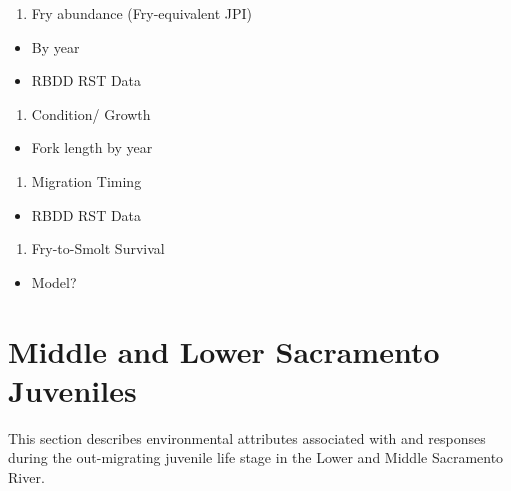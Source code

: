 \documentclass[
]{book}
\providecommand{\tightlist}{%
  \setlength{\itemsep}{0pt}\setlength{\parskip}{0pt}}
\theoremstyle{definition}
\theoremstyle{definition}
\theoremstyle{definition}
\theoremstyle{definition}
\theoremstyle{remark}
\begin{document}
\begin{enumerate}
\def\labelenumi{\arabic{enumi}.}
\tightlist
\item
  Fry abundance (Fry-equivalent JPI)
\end{enumerate}

\begin{itemize}
\tightlist
\item
  By year
\item
  RBDD RST Data
\end{itemize}

\begin{enumerate}
\def\labelenumi{\arabic{enumi}.}
\setcounter{enumi}{1}
\tightlist
\item
  Condition/ Growth
\end{enumerate}

\begin{itemize}
\tightlist
\item
  Fork length by year
\end{itemize}

\begin{enumerate}
\def\labelenumi{\arabic{enumi}.}
\setcounter{enumi}{2}
\tightlist
\item
  Migration Timing
\end{enumerate}

\begin{itemize}
\tightlist
\item
  RBDD RST Data
\end{itemize}

\begin{enumerate}
\def\labelenumi{\arabic{enumi}.}
\setcounter{enumi}{3}
\tightlist
\item
  Fry-to-Smolt Survival
\end{enumerate}

\begin{itemize}
\tightlist
\item
  Model?
\end{itemize}

\hypertarget{middle-and-lower-sacramento-juveniles}{%
\chapter{Middle and Lower Sacramento Juveniles}\label{middle-and-lower-sacramento-juveniles}}

This section describes environmental attributes associated with and responses during the out-migrating juvenile life stage in the Lower and Middle Sacramento River.
\end{document}
